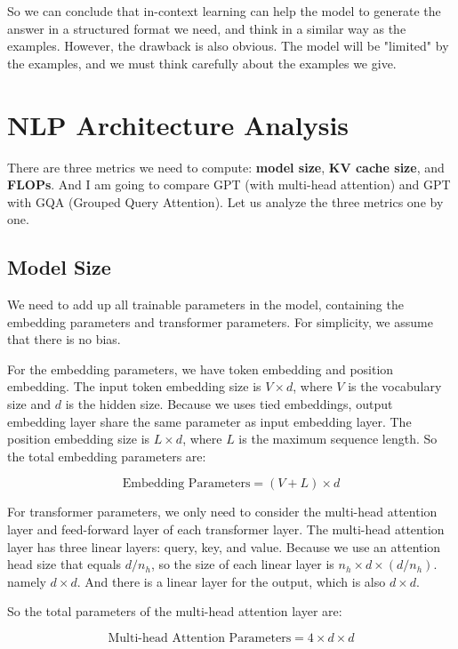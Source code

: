 \documentclass[a4paper,12pt]{article}
\begin{document}
So we can conclude that in-context learning can help the model to generate the answer in a structured format we need, and think in a similar way as the examples. However, the drawback is also obvious. The model will be "limited" by the examples, and we must think carefully about the examples we give.

\section{NLP Architecture Analysis}

There are three metrics we need to compute: \textbf{model size}, \textbf{KV cache size}, and \textbf{FLOPs}. And I am going to compare GPT (with multi-head attention) and GPT with GQA (Grouped Query Attention). Let us analyze the three metrics one by one.

\subsection{Model Size}

We need to add up all trainable parameters in the model, containing the embedding parameters and transformer parameters. For simplicity, we assume that there is no bias.

For the embedding parameters, we have token embedding and position embedding. The input token embedding size is $V \times d$, where $V$ is the vocabulary size and $d$ is the hidden size. Because we uses tied embeddings, output embedding layer share the same parameter as input embedding layer. The position embedding size is $L \times d$, where $L$ is the maximum sequence length. So the total embedding parameters are:

\begin{equation}
    \text{Embedding Parameters} = (V + L) \times d
\end{equation}

For transformer parameters, we only need to consider the multi-head attention layer and feed-forward layer of each transformer layer. The multi-head attention layer has three linear layers: query, key, and value. Because we use an attention head size that equals $d/n_h$, so the size of each linear layer is $n_h \times d \times (d / n_h)$. namely $d \times d$. And there is a linear layer for the output, which is also $d \times d$. 

So the total parameters of the multi-head attention layer are:

\begin{equation}
    \text{Multi-head Attention Parameters} = 4 \times d \times d
\end{equation}
\end{document}

